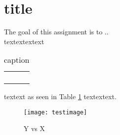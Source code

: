 \section*{title}
The goal of this assignment is to ..\\
textextextext\\

\begin{table}[h]
	\centering
	\begin{tabular}{|l c l|}
		\hline
			&	&	\\
			&	&	\\
			&	&	\\
			&	&	\\
		\hline
	\end{tabular}
	\caption{caption}
	\label{Tab:table1}
\end{table}
%
textext as seen in Table \ref{Tab:table1} textextext.\\

\begin{figure}[H]
	\centering
	\texttt{[image: testimage]}
	\caption{Y vs X}
	\label{fig:image1}
\end{figure}

\newpage